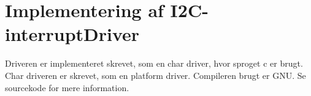 \documentclass[Softwaredesign/Softwaredesign_main.tex]{subfiles}
\begin{document}
\section{Implementering af I2C-interruptDriver}\label{sec:I2C_interruptDriver_implementering_bilag}
Driveren er implementeret skrevet, som en char driver, hvor sproget c er brugt. Char driveren er skrevet, som en platform driver. Compileren brugt er GNU. Se sourcekode for mere information.
\end{document}
